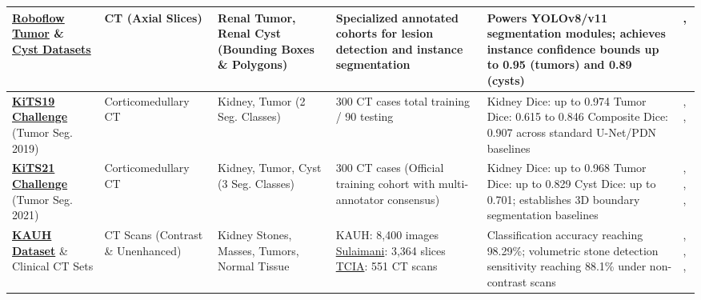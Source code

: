 \begin{longtable}{|L{2.7cm}|L{1.7cm}|L{2.4cm}|L{2.9cm}|L{3.8cm}|L{2.3cm}|}
\textbf{\href{https://universe.roboflow.com/tezskb/kidney-tumor-uqpis}{Roboflow Tumor}} \& \textbf{\href{https://universe.roboflow.com/tezskb/kidney-cyst-6ytvf}{Cyst Datasets}} & 
CT (Axial Slices) & 
Renal Tumor, Renal Cyst (Bounding Boxes \& Polygons) & 
Specialized annotated cohorts for lesion detection and instance segmentation & 
Powers YOLOv8/v11 segmentation modules; achieves instance confidence bounds up to 0.95 (tumors) and 0.89 (cysts) & 
\cite{dataset_roboflow_tumor}, \cite{dataset_roboflow_cyst} \\
\hline

\textbf{\href{https://github.com/neheller/kits19/tree/master/data}{KiTS19 Challenge}} \newline (Tumor Seg. 2019) & 
Corticomedullary CT & 
Kidney, Tumor (2 Seg. Classes) & 
300 CT cases total  training / 90 testing & 
Kidney Dice: up to 0.974 \newline Tumor Dice: 0.615 to 0.846 \newline Composite Dice: 0.907 across standard U-Net/PDN baselines & 
\cite{ji2024kits}, \cite{hatsutani2023segmentation}, \cite{abdelrahman2023efficientnet} \\
\hline

\textbf{\href{https://github.com/neheller/kits21/tree/master/kits21/data}{KiTS21 Challenge}} \newline (Tumor Seg. 2021) & 
Corticomedullary CT & 
Kidney, Tumor, Cyst (3 Seg. Classes) & 
300 CT cases (Official training cohort with multi-annotator consensus) & 
Kidney Dice: up to 0.968 \newline Tumor Dice: up to 0.829 \newline Cyst Dice: up to 0.701; establishes 3D boundary segmentation baselines & 
\cite{heller2023kits21}, \cite{zhao2023automatic}, \cite{chen20215d}, \cite{gohil2024kits} \\
\hline

\textbf{\href{https://github.com/DaliaAlzubi/KidneyTumor}{KAUH Dataset}} \& Clinical CT Sets & 
CT Scans (Contrast \& Unenhanced) & 
Kidney Stones, Masses, Tumors, Normal Tissue & 
KAUH: 8,400 images \newline \href{https://www.kaggle.com/datasets/orvile/axial-ct-imaging-dataset-kidney-stone-detection}{Sulaimani}: 3,364 slices \newline \href{https://www.cancerimagingarchive.net/collection/ct-colonography/}{TCIA}: 551 CT scans & 
Classification accuracy reaching 98.29\%; volumetric stone detection sensitivity reaching 88.1\% under non-contrast scans & 
\cite{aljohani2025clinical}, \cite{alzubi2022kidney}, \cite{abdalla2025kidney}, \cite{elton2022deep} \\
\hline


\end{longtable}
